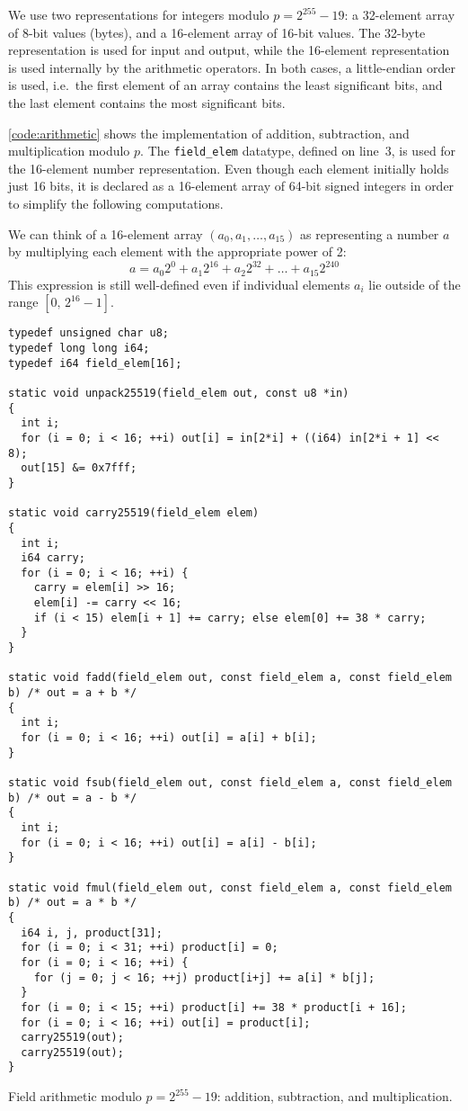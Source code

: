 \documentclass[manuscript]{acmart}
\begin{document}
We use two representations for integers modulo $p = 2^{255}-19$: a 32-element array of 8-bit values (bytes), and a 16-element array of 16-bit values.
The 32-byte representation is used for input and output, while the 16-element representation is used internally by the arithmetic operators.
In both cases, a little-endian order is used, i.e.\ the first element of an array contains the least significant bits, and the last element contains the most significant bits.

\autoref{code:arithmetic} shows the implementation of addition, subtraction, and multiplication modulo $p$.
The \verb|field_elem| datatype, defined on line~3, is used for the 16-element number representation.
Even though each element initially holds just 16 bits, it is declared as a 16-element array of 64-bit signed integers in order to simplify the following computations.

We can think of a 16-element array $(a_0, a_1, \dots, a_{15})$ as representing a number $a$ by multiplying each element with the appropriate power of 2:
\[ a = a_0 2^0 + a_1 2^{16} + a_2 2^{32} + \dots + a_{15} 2^{240} \]
This expression is still well-defined even if individual elements $a_i$ lie outside of the range $[0,\, 2^{16}-1]$.

\begin{listing}
\begin{verbatim}
typedef unsigned char u8;
typedef long long i64;
typedef i64 field_elem[16];

static void unpack25519(field_elem out, const u8 *in)
{
  int i;
  for (i = 0; i < 16; ++i) out[i] = in[2*i] + ((i64) in[2*i + 1] << 8);
  out[15] &= 0x7fff;
}

static void carry25519(field_elem elem)
{
  int i;
  i64 carry;
  for (i = 0; i < 16; ++i) {
    carry = elem[i] >> 16;
    elem[i] -= carry << 16;
    if (i < 15) elem[i + 1] += carry; else elem[0] += 38 * carry;
  }
}

static void fadd(field_elem out, const field_elem a, const field_elem b) /* out = a + b */
{
  int i;
  for (i = 0; i < 16; ++i) out[i] = a[i] + b[i];
}

static void fsub(field_elem out, const field_elem a, const field_elem b) /* out = a - b */
{
  int i;
  for (i = 0; i < 16; ++i) out[i] = a[i] - b[i];
}

static void fmul(field_elem out, const field_elem a, const field_elem b) /* out = a * b */
{
  i64 i, j, product[31];
  for (i = 0; i < 31; ++i) product[i] = 0;
  for (i = 0; i < 16; ++i) {
    for (j = 0; j < 16; ++j) product[i+j] += a[i] * b[j];
  }
  for (i = 0; i < 15; ++i) product[i] += 38 * product[i + 16];
  for (i = 0; i < 16; ++i) out[i] = product[i];
  carry25519(out);
  carry25519(out);
}
\end{verbatim}
\caption{Field arithmetic modulo $p = 2^{255} - 19$: addition, subtraction, and multiplication.}\label{code:arithmetic}
\end{listing}
\end{document}
